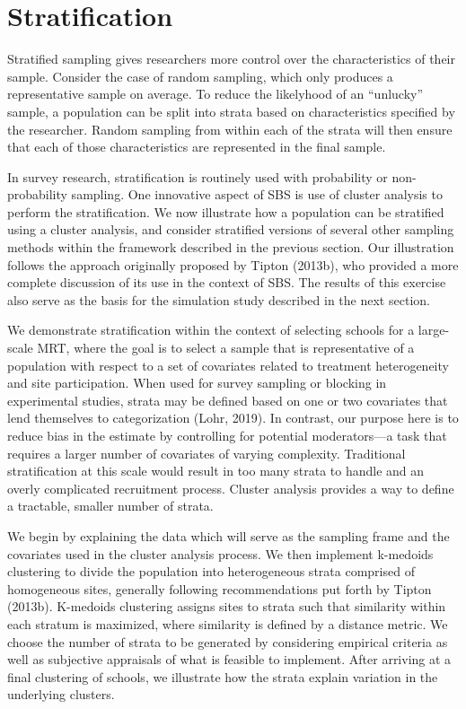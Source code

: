 \documentclass[english,man,floatsintext]{apa6}
\begin{document}
\hypertarget{stratification}{%
\section{Stratification}\label{stratification}}

Stratified sampling gives researchers more control over the characteristics of their sample. Consider the case of random sampling, which only produces a representative sample on average. To reduce the likelyhood of an \enquote{unlucky} sample, a population can be split into strata based on characteristics specified by the researcher. Random sampling from within each of the strata will then ensure that each of those characteristics are represented in the final sample.

In survey research, stratification is routinely used with probability or non-probability sampling. One innovative aspect of SBS is use of cluster analysis to perform the stratification. We now illustrate how a population can be stratified using a cluster analysis, and consider stratified versions of several other sampling methods within the framework described in the previous section.
Our illustration follows the approach originally proposed by Tipton (2013b), who provided a more complete discussion of its use in the context of SBS.
The results of this exercise also serve as the basis for the simulation study described in the next section.

We demonstrate stratification within the context of selecting schools for a large-scale MRT, where the goal is to select a sample that is representative of a population with respect to a set of covariates related to treatment heterogeneity and site participation. When used for survey sampling or blocking in experimental studies, strata may be defined based on one or two covariates that lend themselves to categorization (Lohr, 2019). In contrast, our purpose here is to reduce bias in the estimate by controlling for potential moderators---a task that requires a larger number of covariates of varying complexity. Traditional stratification at this scale would result in too many strata to handle and an overly complicated recruitment process. Cluster analysis provides a way to define a tractable, smaller number of strata.

We begin by explaining the data which will serve as the sampling frame and the covariates used in the cluster analysis process. We then implement k-medoids clustering to divide the population into heterogeneous strata comprised of homogeneous sites, generally following recommendations put forth by Tipton (2013b). K-medoids clustering assigns sites to strata such that similarity within each stratum is maximized, where similarity is defined by a distance metric. We choose the number of strata to be generated by considering empirical criteria as well as subjective appraisals of what is feasible to implement. After arriving at a final clustering of schools, we illustrate how the strata explain variation in the underlying clusters.
\end{document}
